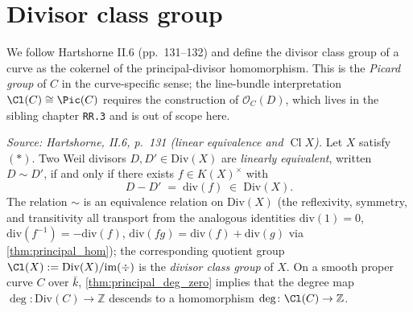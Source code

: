 \section{Divisor class group}
We follow Hartshorne II.6 (pp.~131--132) and define the divisor class group
of a curve as the cokernel of the principal-divisor homomorphism. This is
the \emph{Picard group} of \(C\) in the curve-specific sense; the line-bundle
interpretation \(\Cl(C) \cong \Pic(C)\) requires the construction of
\(\mathcal O_C(D)\), which lives in the sibling chapter \texttt{RR.3} and is
out of scope here.
\begin{definition}
  \label{def:linear_equivalence}
  \textit{Source: Hartshorne, II.6, p.~131 (linear equivalence and
  \(\operatorname{Cl} X\)).}
  Let \(X\) satisfy \((*)\). Two Weil divisors \(D, D' \in \mathrm{Div}(X)\) are
  \emph{linearly equivalent}, written \(D \sim D'\), if and only if there
  exists \(f \in K(X)^{\times}\) with
  \[
    D - D' \;=\; \mathrm{div}(f) \;\in\; \mathrm{Div}(X).
  \]
  The relation \(\sim\) is an equivalence relation on \(\mathrm{Div}(X)\) (the
  reflexivity, symmetry, and transitivity all transport from the analogous
  identities \(\mathrm{div}(1) = 0\), \(\mathrm{div}(f^{-1}) = -\mathrm{div}(f)\), $\mathrm{div}(fg) =
  \mathrm{div}(f) + \mathrm{div}(g)$ via \ref{thm:principal_hom}); the corresponding
  quotient group \(\Cl(X) := \mathrm{Div}(X) / \mathrm{im}(\div)\) is the
  \emph{divisor class group} of \(X\). On a smooth proper curve \(C\) over
  \(\bar k\), \ref{thm:principal_deg_zero} implies that the degree map
  \(\deg \colon \mathrm{Div}(C) \to \mathbb Z\) descends to a homomorphism
  \(\deg \colon \Cl(C) \to \mathbb Z\).
\end{definition}
